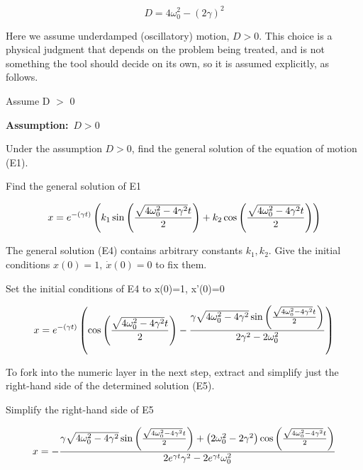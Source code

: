 \documentclass[dvipdfmx]{article}
\begin{document}
\begin{equation}
  D = 4 \omega_0^2 - (2 \gamma)^2
  \label{eq:E3}
\end{equation}

Here we assume underdamped (oscillatory) motion, $D>0$. This choice is a physical judgment that depends on the problem being treated, and is not something the tool should decide on its own, so it is assumed explicitly, as follows.

Assume D $>$ 0

\noindent\textbf{Assumption:}\ $\displaystyle D > 0$\par

Under the assumption $D>0$, find the general solution of the equation of motion (E1).

Find the general solution of E1

\begin{equation}
  x=e^ {- \left(\gamma t\right) } \left(k_{1} \sin \left({{\sqrt{4 \omega_{0}^2-4 \gamma^2} t}\over{2}}\right)+k_{2} \cos \left({{\sqrt{4 \omega_{0}^2-4 \gamma^2} t}\over{2}}\right)\right)
  \label{eq:E4}
\end{equation}

The general solution (E4) contains arbitrary constants $k_1,k_2$. Give the initial conditions $x(0)=1,\ \dot x(0)=0$ to fix them.

Set the initial conditions of E4 to x(0)=1, x'(0)=0

\begin{equation}
  x = e^ {- \left(\gamma t\right) } \left(\cos \left({{\sqrt{4 \omega_{0}^2-4 \gamma^2} t}\over{2}}\right)-{{\gamma \sqrt{4 \omega_{0}^2-4 \gamma^2} \sin \left({{\sqrt{4 \omega_{0}^2-4 \gamma^2} t}\over{2}}\right)}\over{2 \gamma^2-2 \omega_{0}^2}}\right)
  \label{eq:E5}
\end{equation}

To fork into the numeric layer in the next step, extract and simplify just the right-hand side of the determined solution (E5).

Simplify the right-hand side of E5

\begin{equation}
  x = -{{\gamma \sqrt{4 \omega_{0}^2-4 \gamma^2} \sin \left({{\sqrt{4 \omega_{0}^2-4 \gamma^2} t}\over{2}}\right)+\left(2 \omega_{0}^2-2 \gamma^2\right) \cos \left({{\sqrt{4 \omega_{0}^2-4 \gamma^2} t}\over{2}}\right)}\over{2 e^{\gamma t} \gamma^2-2 e^{\gamma t} \omega_{0}^2}}
  \label{eq:E6}
\end{equation}
\end{document}
